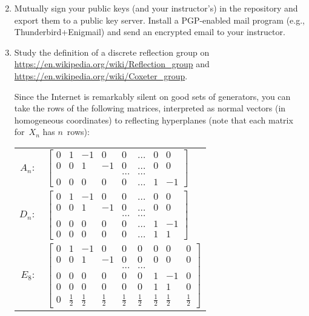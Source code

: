 \documentclass[11pt]{amsart}
\begin{document}
\begin{enumerate}
\setcounter{enumi}{1}
\setlength{\itemsep}{2ex}

\item Mutually sign your public keys (and your instructor's) in the repository and export them to a public key server. Install a PGP-enabled mail program (e.g., Thunderbird+Enigmail) and send an encrypted email to your instructor.

\item Study the definition of a discrete reflection group on \url{https://en.wikipedia.org/wiki/Reflection_group} and \url{https://en.wikipedia.org/wiki/Coxeter_group}. 

Since the Internet is remarkably silent on good sets of generators, you can take the rows of the following matrices, interpreted as normal vectors (in homogeneous coordinates) to reflecting hyperplanes (note that each matrix for~$X_n$ has $n$~rows):

\begin{multicols}{2}
  \begin{tabular}[c]{rl}
    $A_{n}:$ 
    &\small 
    $\begin{bmatrix}
     0 & 1 & -1 & 0 & 0 & \dots & 0 & 0 \\
     0 & 0 & 1 & -1 & 0 & \dots & 0 & 0 \\
     &&&&\dots&\dots \\
     0 & 0 & 0 & 0 & 0 & \dots & 1 & -1 
    \end{bmatrix}$
    \\[6ex]
    $D_n:$      
    &\small
    $\begin{bmatrix}
     0 & 1 & -1 & 0 & 0 & \dots & 0 & 0 \\
     0 & 0 & 1 & -1 & 0 & \dots & 0 & 0 \\
     &&&&\dots&\dots\\
     0 & 0 & 0 & 0 & 0 & \dots & 1 & -1 \\
     0 & 0 & 0 & 0 & 0 & \dots & 1 & 1   
    \end{bmatrix}$
    \\[8ex]
    $E_8:$
    &\small 
    $\begin{bmatrix}
     0 & 1 & -1 & 0 & 0 & 0 & 0 & 0 & 0 \\
     0 & 0 & 1 & -1 & 0 & 0 & 0 & 0 & 0 \\
     &&&&\dots&\dots\\
     0 & 0 & 0 & 0 & 0 & 0 & 1 & -1 & 0 \\
     0 & 0 & 0 & 0 & 0 & 0 & 1 & 1 & 0 \\
     0 & \frac12 & \frac12 & \frac12 & \frac12 & \frac12 & \frac12 & \frac12 & \frac12  
    \end{bmatrix}$
  \end{tabular}


\end{multicols}
\end{enumerate}
\end{document}

